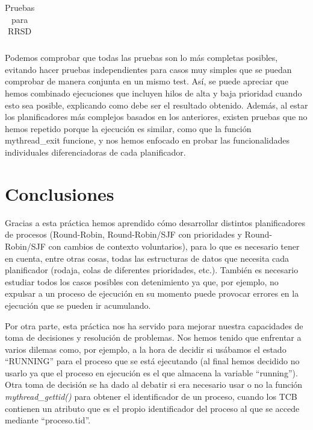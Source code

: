 \documentclass[10pt, spanish, pdftex]{template/UC3M_document}
\begin{document}
\begin{table}[h!]
\begin{tabular}{|C{0.15\textwidth}|C{0.4\textwidth}|C{0.35\textwidth}|}
   \end{tabular}
    \caption{Pruebas para RRSD}
    \label{fig:resultRRSD}
\end{table}

\newpage
Podemos comprobar que todas las pruebas son lo más completas posibles, evitando hacer pruebas independientes para casos muy simples que se puedan comprobar de manera conjunta en un mismo test. Así, se puede apreciar que hemos combinado ejecuciones que incluyen hilos de alta y baja prioridad cuando esto sea posible, explicando como debe ser el resultado obtenido. Además, al estar los planificadores más complejos basados en los anteriores, existen pruebas que no hemos repetido porque la ejecución es similar, como que la función mythread\_exit funcione, y nos hemos enfocado en probar las funcionalidades individuales diferenciadoras de cada planificador.

\newpage
\section{Conclusiones}
Gracias a esta práctica hemos aprendido cómo desarrollar distintos planificadores de procesos (Round-Robin, Round-Robin/SJF con prioridades y Round-Robin/SJF con cambios de contexto voluntarios), para lo que es necesario tener en cuenta, entre otras cosas, todas las estructuras de datos que necesita cada planificador (rodaja, colas de diferentes prioridades, etc.). También es necesario estudiar todos los casos posibles con detenimiento ya que, por ejemplo, no expulsar a un proceso de ejecución en su momento puede provocar errores en la ejecución que se pueden ir acumulando. 

Por otra parte, esta práctica nos ha servido para mejorar nuestra capacidades de toma de decisiones y resolución de problemas. Nos hemos tenido que enfrentar a varios dilemas como, por ejemplo, a la hora de decidir si usábamos el estado “RUNNING” para el proceso que se está ejecutando (al final hemos decidido no usarlo ya que el proceso en ejecución es el que almacena la variable “running”). Otra toma de decisión se ha dado al  debatir si era necesario usar o no la función \textit{mythread\_gettid()} para obtener el identificador de un proceso, cuando los TCB contienen un atributo que es el propio identificador del proceso al que se accede mediante “proceso.tid”.
\end{document}
